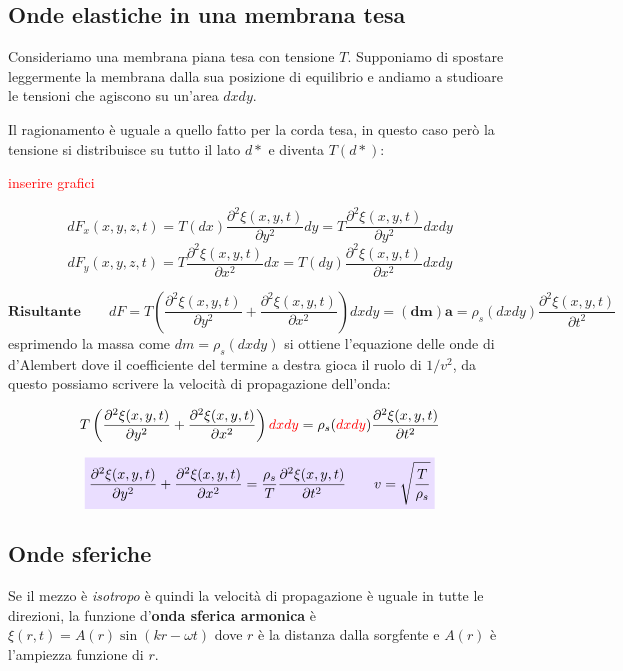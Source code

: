 \documentclass[x11names]{report}
\newcommand{\viola}[1]{\colorbox{yred}{$\displaystyle #1$}}
\begin{document}
	\subsection{Onde elastiche in una membrana tesa}
	Consideriamo una membrana piana tesa con tensione \(T\). Supponiamo di spostare leggermente la membrana dalla sua posizione di equilibrio e andiamo a studioare le tensioni che agiscono su un'area \(dxdy\). 
	
	Il ragionamento è uguale a quello fatto per la corda tesa, in questo caso però la tensione si distribuisce su tutto il lato \(d*\) e diventa \(T(d*)\):
	
	\begin{center}
		\textcolor{red}{inserire grafici}
	\end{center}
	
	\[ 
	dF_x(x,y,z,t) = T(dx)\frac{\partial^2 \xi(x,y,t)}{\partial y^2}dy = T\frac{\partial^2\xi(x,y,t)}{\partial y^2}dxdy
	\]
	\[ 
	dF_y(x,y,z,t) = T\frac{\partial^2 \xi(x,y,t)}{\partial x^2}dx = T(dy)\frac{\partial^2\xi(x,y,t)}{\partial x^2}dxdy 
	\]
	
	\[ 
	\textbf{Risultante} \qquad	dF = T\left(\frac{\partial^2\xi(x,y,t)}{\partial y^2} + \frac{\partial^2\xi(x,y,t)}{\partial x^2}\right)dxdy \mathbf{=(dm)a = }  \rho_s(dxdy)\frac{\partial^2\xi(x,y,t)}{\partial t^2}
	\]
	esprimendo la massa come \(dm = \rho_s (dxdy)\) si ottiene l'equazione delle onde di d'Alembert dove il coefficiente del termine a destra gioca il ruolo di \(1/v^2\), da questo possiamo scrivere la velocità di propagazione dell'onda:
	
	\[ 
	T\left(\frac{\partial^2\xi(x,y,t)}{\partial y^2} + \frac{\partial^2\xi(x,y,t)}{\partial x^2}\right)\textcolor{red}{dxdy} = \rho_s(\textcolor{red}{dxdy})\frac{\partial^2\xi(x,y,t)}{\partial t^2}
	\]
	
	
	\begin{equation}
		\viola{\frac{\partial^2\xi(x,y,t)}{\partial y^2} + \frac{\partial^2\xi(x,y,t)}{\partial x^2} = \frac{\rho_s}{T}\frac{\partial^2\xi(x,y,t)}{\partial t^2} \qquad v = \sqrt{\frac{T}{\rho_s}}}
	\end{equation}

	
	
	
	\subsection{Onde sferiche}
	Se il mezzo è \textit{isotropo} è quindi la velocità di propagazione è uguale in tutte le direzioni, la funzione d'\textbf{onda sferica armonica} è \(\xi(r,t) = A(r)\sin\left(kr -\omega t\right)\) dove \(r\) è la distanza dalla sorgfente e \(A(r)\) è l'ampiezza funzione di \(r\). \\
	
\end{document}

